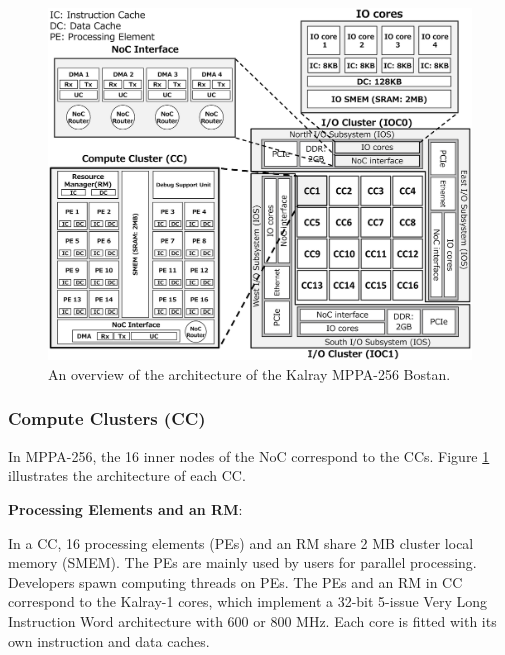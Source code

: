 \documentclass[conference,compsoc]{IEEEtran}
\newcommand{\comment}[1]{}
\begin{document}
\begin{figure}[t]
  \centering
  \includegraphics[width=1.0\linewidth]{../figure/mppa_architecture.eps}
  \vspace{-7mm}
  \caption{\label{fig:mppa_architecture}
    An overview of the architecture of the Kalray MPPA-256 Bostan.}
  \vspace{-5mm}
\end{figure}

\vspace{-2mm}
\subsubsection{Compute Clusters (CC)}
\label{sec:cc}
In MPPA-256, the 16 inner nodes of the NoC correspond to the CCs.
Figure \ref{fig:mppa_architecture} illustrates the architecture of each CC.

\textbf{Processing Elements and an RM}:
\comment{2-3}
In a CC, 16 processing elements (PEs) and an RM share 2 MB cluster local memory (SMEM).
The PEs are mainly used by users for parallel processing.
Developers spawn computing threads on PEs.
The PEs and an RM in CC correspond to the Kalray-1 cores, which implement a 32-bit 5-issue Very Long Instruction Word architecture with 600 or 800 MHz.
Each core is fitted with its own instruction and data caches.
\end{document}
